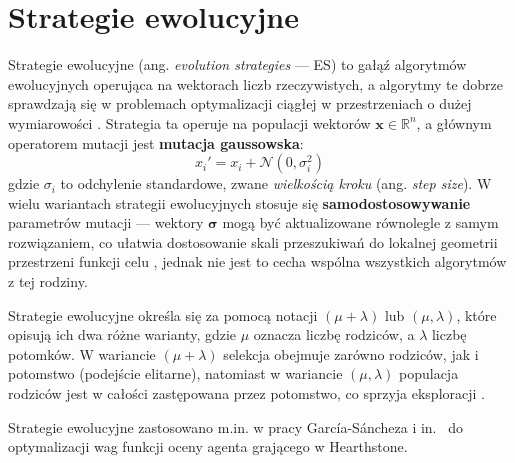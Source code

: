 \section{Strategie ewolucyjne}

Strategie ewolucyjne (ang. \textit{evolution strategies} --- ES) to gałąź algorytmów ewolucyjnych operująca na wektorach liczb rzeczywistych, a algorytmy te dobrze sprawdzają się w problemach optymalizacji ciągłej w przestrzeniach o dużej wymiarowości \cite{Hansen2016CMA}. Strategia ta operuje na populacji wektorów $\mathbf{x} \in \mathbb{R}^n$, a głównym operatorem mutacji jest \textbf{mutacja gaussowska}:
\[
x_i' = x_i + \mathcal{N}(0, \sigma_i^2)
\]
gdzie $\sigma_i$ to odchylenie standardowe, zwane \textit{wielkością kroku} (ang. \textit{step size}). W wielu wariantach strategii ewolucyjnych stosuje się \textbf{samodostosowywanie} parametrów mutacji --- wektory $\boldsymbol{\sigma}$ mogą być aktualizowane równolegle z samym rozwiązaniem, co ułatwia dostosowanie skali przeszukiwań do lokalnej geometrii przestrzeni funkcji celu \cite{Hansen2016CMA}, jednak nie jest to cecha wspólna wszystkich algorytmów z tej rodziny.

Strategie ewolucyjne określa się za pomocą notacji $(\mu + \lambda)$ lub $(\mu, \lambda)$, które opisują ich dwa różne warianty, gdzie $\mu$ oznacza liczbę rodziców, a $\lambda$ liczbę potomków. W wariancie $(\mu + \lambda)$ selekcja obejmuje zarówno rodziców, jak i potomstwo (podejście elitarne), natomiast w wariancie $(\mu, \lambda)$ populacja rodziców jest w całości zastępowana przez potomstwo, co sprzyja eksploracji \cite{Hansen2016CMA}.

Strategie ewolucyjne zastosowano m.in. w pracy García-Sáncheza i in.~\cite{sanchez2020} do optymalizacji wag funkcji oceny agenta grającego w Hearthstone.

